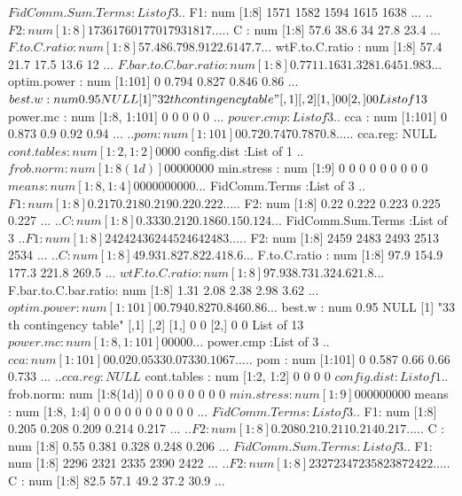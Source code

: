 \documentclass[11pt]{article} %
\begin{document}
\begin{Schunk}
\begin{Soutput}
 $ FidComm.Sum.Terms   :List of 3
  ..$ F1: num [1:8] 1571 1582 1594 1615 1638 ...
  ..$ F2: num [1:8] 1736 1760 1770 1793 1817 ...
  ..$ C : num [1:8] 57.6 38.6 34 27.8 23.4 ...
 $ F.to.C.ratio        : num [1:8] 57.4 86.7 98.9 122.6 147.7 ...
 $ wtF.to.C.ratio      : num [1:8] 57.4 21.7 17.5 13.6 12 ...
 $ F.bar.to.C.bar.ratio: num [1:8] 0.771 1.163 1.328 1.645 1.983 ...
 $ optim.power         : num [1:101] 0 0.794 0.827 0.846 0.86 ...
 $ best.w              : num 0.95
NULL
[1] "32 th contingency table"
     [,1] [,2]
[1,]    0    0
[2,]    0    0
List of 13
 $ power.mc            : num [1:8, 1:101] 0 0 0 0 0 ...
 $ power.cmp           :List of 3
  ..$ cca    : num [1:101] 0 0.873 0.9 0.92 0.94 ...
  ..$ pom    : num [1:101] 0 0.72 0.747 0.787 0.8 ...
  ..$ cca.reg: NULL
 $ cont.tables         : num [1:2, 1:2] 0 0 0 0
 $ config.dist         :List of 1
  ..$ frob.norm: num [1:8(1d)] 0 0 0 0 0 0 0 0
 $ min.stress          : num [1:9] 0 0 0 0 0 0 0 0 0
 $ means               : num [1:8, 1:4] 0 0 0 0 0 0 0 0 0 0 ...
 $ FidComm.Terms       :List of 3
  ..$ F1: num [1:8] 0.217 0.218 0.219 0.22 0.222 ...
  ..$ F2: num [1:8] 0.22 0.222 0.223 0.225 0.227 ...
  ..$ C : num [1:8] 0.333 0.212 0.186 0.15 0.124 ...
 $ FidComm.Sum.Terms   :List of 3
  ..$ F1: num [1:8] 2424 2436 2445 2464 2483 ...
  ..$ F2: num [1:8] 2459 2483 2493 2513 2534 ...
  ..$ C : num [1:8] 49.9 31.8 27.8 22.4 18.6 ...
 $ F.to.C.ratio        : num [1:8] 97.9 154.9 177.3 221.8 269.5 ...
 $ wtF.to.C.ratio      : num [1:8] 97.9 38.7 31.3 24.6 21.8 ...
 $ F.bar.to.C.bar.ratio: num [1:8] 1.31 2.08 2.38 2.98 3.62 ...
 $ optim.power         : num [1:101] 0 0.794 0.827 0.846 0.86 ...
 $ best.w              : num 0.95
NULL
[1] "33 th contingency table"
     [,1] [,2]
[1,]    0    0
[2,]    0    0
List of 13
 $ power.mc            : num [1:8, 1:101] 0 0 0 0 0 ...
 $ power.cmp           :List of 3
  ..$ cca    : num [1:101] 0 0.02 0.0533 0.0733 0.1067 ...
  ..$ pom    : num [1:101] 0 0.587 0.66 0.66 0.733 ...
  ..$ cca.reg: NULL
 $ cont.tables         : num [1:2, 1:2] 0 0 0 0
 $ config.dist         :List of 1
  ..$ frob.norm: num [1:8(1d)] 0 0 0 0 0 0 0 0
 $ min.stress          : num [1:9] 0 0 0 0 0 0 0 0 0
 $ means               : num [1:8, 1:4] 0 0 0 0 0 0 0 0 0 0 ...
 $ FidComm.Terms       :List of 3
  ..$ F1: num [1:8] 0.205 0.208 0.209 0.214 0.217 ...
  ..$ F2: num [1:8] 0.208 0.21 0.211 0.214 0.217 ...
  ..$ C : num [1:8] 0.55 0.381 0.328 0.248 0.206 ...
 $ FidComm.Sum.Terms   :List of 3
  ..$ F1: num [1:8] 2296 2321 2335 2390 2422 ...
  ..$ F2: num [1:8] 2327 2347 2358 2387 2422 ...
  ..$ C : num [1:8] 82.5 57.1 49.2 37.2 30.9 ...

\end{Soutput}
\end{Schunk}
\end{document}
